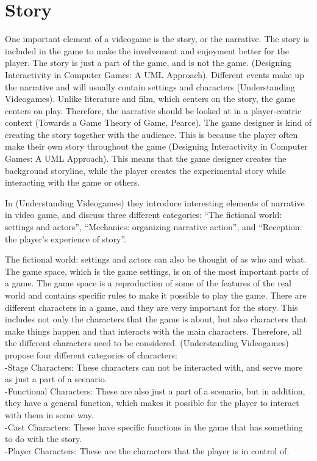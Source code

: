 \section{Story}
One important element of a videogame is the story, or the narrative. The story is included in the game to make the involvement and enjoyment better for the player. The story is just a part of the game, and is not the game. (Designing Interactivity in Computer Games: A UML Approach).  Different events make up the narrative and will usually contain settings and characters (Understanding Videogames). Unlike literature and film, which centers on the story, the game centers on play. Therefore, the narrative should be looked at in a player-centric context (Towards a Game Theory of Game, Pearce). The game designer is kind of creating the story together with the audience. This is because the player often make their own story throughout the game (Designing Interactivity in Computer Games: A UML Approach). This means that the game designer creates the background storyline, while the player creates the experimental story while interacting with the game or others. 

In (Understanding Videogames) they introduce interesting elements of narrative in video game, and discuss three different categories: “The fictional world: settings and actors”, “Mechanics: organizing narrative action”, and “Reception: the player’s experience of story”.

The fictional world: settings and actors can also be thought of as who and what. The game space, which is the game settings, is on of the most important parts of a game. The game space is a reproduction of some of the features of the real world and contains specific rules to make it possible to play the game. There are different characters in a game, and they are very important for the story. This includes not only the characters that the game is about, but also characters that make things happen and that interacts with the main characters. Therefore, all the different characters need to be considered. (Understanding Videogames) propose four different categories of characters: \\
-Stage Characters: These characters can not be interacted with, and serve more as just a part of a scenario. \\
-Functional Characters: These are also just a part of a scenario, but in addition, they have a general function, which makes it possible for the player to interact with them in some way. \\
-Cast Characters: These have specific functions in the game that has something to do with the story. \\
-Player Characters: These are the characters that the player is in control of. 


